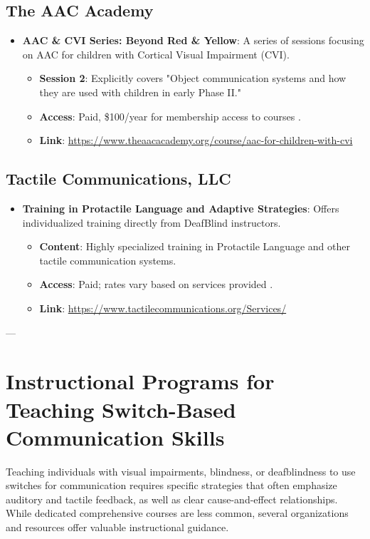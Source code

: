 \subsection{The AAC Academy}
\begin{itemize}
    \item \textbf{AAC \& CVI Series: Beyond Red \& Yellow}: A series of sessions focusing on AAC for children with Cortical Visual Impairment (CVI).
    \begin{itemize}
        \item \textbf{Session 2}: Explicitly covers "Object communication systems and how they are used with children in early Phase II."
        \item \textbf{Access}: Paid, \$100/year for membership access to courses  \cite{AACA_CVI}.
        \item \textbf{Link}: \url{https://www.theaacacademy.org/course/aac-for-children-with-cvi}
    \end{itemize}
\end{itemize}

\subsection{Tactile Communications, LLC}
\begin{itemize}
    \item \textbf{Training in Protactile Language and Adaptive Strategies}: Offers individualized training directly from DeafBlind instructors.
    \begin{itemize}
        \item \textbf{Content}: Highly specialized training in Protactile Language and other tactile communication systems.
        \item \textbf{Access}: Paid; rates vary based on services provided  \cite{TactileComms}.
        \item \textbf{Link}: \url{https://www.tactilecommunications.org/Services/}
    \end{itemize}
\end{itemize}

---

\section{Instructional Programs for Teaching Switch-Based Communication Skills}
Teaching individuals with visual impairments, blindness, or deafblindness to use switches for communication requires specific strategies that often emphasize auditory and tactile feedback, as well as clear cause-and-effect relationships. While dedicated comprehensive courses are less common, several organizations and resources offer valuable instructional guidance.

